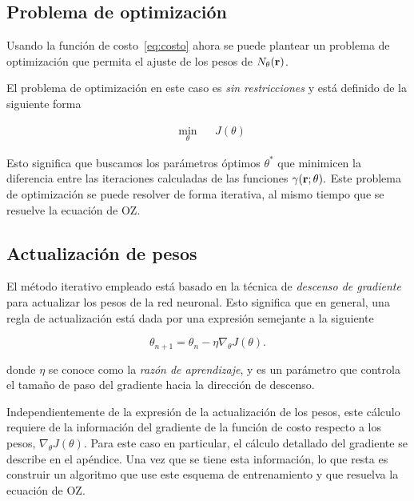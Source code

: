 \subsection{Problema de optimización}
Usando la función de costo~\eqref{eq:costo} ahora se puede plantear un problema de optimización
que permita el ajuste de los pesos de $N_{\theta}(\mathbf{r})$.

El problema de optimización en este caso es \emph{sin restricciones} y está
definido de la siguiente forma

\begin{equation}
    \begin{aligned}
         & \underset{\theta}{\text{min}}
         & & J(\theta)
    \end{aligned}
    \label{eq:optimizacion}
\end{equation}

Esto significa que buscamos los parámetros óptimos $\theta^*$ que minimicen la diferencia
entre las iteraciones calculadas de las funciones $\gamma(\mathbf{r}; \theta).$
Este problema de optimización se puede resolver de forma iterativa, al mismo tiempo que
se resuelve la ecuación de OZ.

\subsection{Actualización de pesos}
El método iterativo empleado está basado en la técnica de \emph{descenso de gradiente}
para actualizar los pesos de la red neuronal.
Esto significa que en general, una regla de actualización está dada por una expresión
semejante a la siguiente

\begin{equation}
    \theta_{n+1} = \theta_n - \eta \nabla_{\theta} J(\theta) .
    \label{eq:gradiente}
\end{equation}

donde $\eta$ se conoce como la \emph{razón de aprendizaje}, y es un parámetro que controla
el tamaño de paso del gradiente hacia la dirección de descenso.

Independientemente de la expresión de la actualización de los pesos, este cálculo
requiere de la información del gradiente de la función de costo respecto a los pesos,
$\nabla_{\theta} J(\theta)$.
Para este caso en particular, el cálculo detallado del gradiente se describe en el apéndice.
Una vez que se tiene esta información, lo que resta es construir un algoritmo que use
este esquema de entrenamiento y que resuelva la ecuación de OZ.

